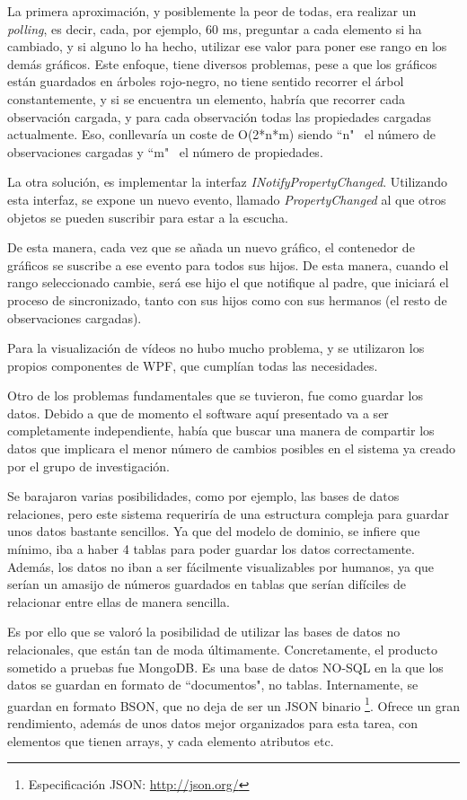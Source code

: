 La primera aproximaci\'on, y posiblemente la peor de todas, era realizar un \emph{polling}, es decir, cada, por ejemplo, 60 ms,
preguntar a cada elemento si ha cambiado, y si alguno lo ha hecho, utilizar ese valor para poner ese rango en los dem\'as 
gr\'aficos. Este enfoque, tiene diversos problemas, pese a que los gr\'aficos est\'an guardados en \'arboles rojo-negro,
no tiene sentido recorrer el \'arbol constantemente, y si se encuentra un elemento, habr\'ia que recorrer cada observaci\'on cargada,
y para cada observaci\'on todas las propiedades cargadas actualmente. Eso,
conllevar\'ia un coste de O(2*n*m) siendo ``n" \ el n\'umero de observaciones cargadas y ``m" \ el n\'umero de propiedades.

La otra soluci\'on, es implementar la interfaz \emph{INotifyPropertyChanged}. Utilizando esta interfaz, se expone un 
nuevo evento, llamado \emph{PropertyChanged} al que otros objetos se pueden suscribir para estar a la escucha.

De esta manera, cada vez que se a\~nada un nuevo gr\'afico, el contenedor de gr\'aficos se suscribe a ese evento para todos
sus hijos. De esta manera, cuando el rango seleccionado cambie, ser\'a ese hijo el que notifique al padre, que iniciar\'a
el proceso de sincronizado, tanto con sus hijos como con sus hermanos (el resto de observaciones cargadas).

Para la visualizaci\'on de v\'ideos no hubo mucho problema, y se utilizaron los
propios componentes de WPF, que cumpl\'ian todas las necesidades.

Otro de los problemas fundamentales que se tuvieron, fue como guardar los datos. Debido a que de momento el software
aqu\'i presentado va a ser completamente independiente, hab\'ia que buscar una manera de compartir los datos
que implicara el menor n\'umero de cambios posibles en el sistema ya creado por el grupo de investigaci\'on.

Se barajaron varias posibilidades, como por ejemplo, las bases de datos relaciones, pero este sistema requerir\'ia
de una estructura compleja para guardar unos datos bastante sencillos. Ya que del modelo de dominio, se infiere que m\'inimo,
iba a haber 4 tablas para poder guardar los datos correctamente. Adem\'as, los datos no iban a ser f\'acilmente 
visualizables por humanos, ya que ser\'ian un amasijo de n\'umeros guardados en tablas que ser\'ian dif\'iciles de
relacionar entre ellas de manera sencilla.

Es por ello que se valor\'o la posibilidad de utilizar las bases de datos no relacionales, que est\'an tan de moda
\'ultimamente. Concretamente, el producto sometido a pruebas fue MongoDB. Es una base de datos NO-SQL en la que los
datos se guardan en formato de ``documentos", no tablas. Internamente, se guardan en formato BSON, que no deja de ser
un JSON binario \footnote{Especificaci\'{o}n JSON: \url{http://json.org/}}. Ofrece un gran rendimiento, adem\'as
de unos datos mejor organizados para esta tarea, con elementos que tienen arrays, y cada elemento atributos etc.

